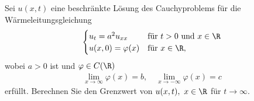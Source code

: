 
\begin{exercise}

Sei $u(x,t)$ eine beschränkte Lösung des Cauchyproblems für die Wärmeleitungsgleichung
\begin{align*}
  \begin{cases}
    u_t = a^2u_{xx} & \text{für } t > 0 \text{ und } x \in \R \\
    u(x,0) = \varphi(x) & \text{für } x \in \R,
  \end{cases}
\end{align*}
wobei $a > 0$ ist und $\varphi \in C(\R)$
\begin{align*}
  \lim_{x \to \infty} \varphi(x) = b, \quad \lim_{x \to -\infty} \varphi(x) = c
\end{align*}
erfüllt. Berechnen Sie den Grenzwert von $u(x,t),\ x \in \R$ für $t \to \infty$.
\end{exercise}


